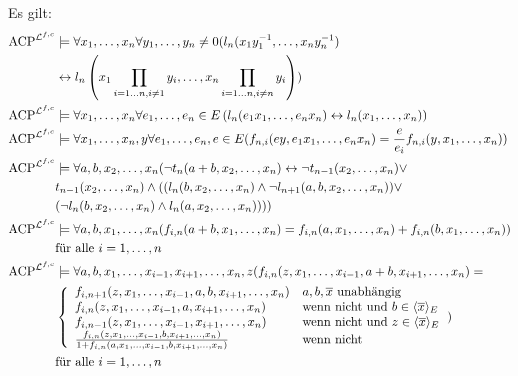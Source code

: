     \begin{lemma}\label{Eliminierungsregeln}
    	Es gilt:\\
    	\begin{align*}\operatorname{ACP}^{\lfc}&\models\forall x_1,\dots,x_n\forall y_1,\dots,y_n\neq0(l_n(x_1y_1^{-1},\dots,x_ny_n^{-1})\\&\leftrightarrow l_n\left(x_1\prod\limits_{i=1\dots n,i\neq 1}y_i,\dots,x_n\prod\limits_{i=1\dots n,i\neq n}y_i\right))\\
    	\operatorname{ACP}^{\lfc}&\models\forall x_1,\dots,x_n\forall e_1,\dots,e_n\in E\left(l_n(e_1x_1,\dots,e_nx_n)\leftrightarrow l_n(x_1,\dots,x_n)\right)\\
    	\operatorname{ACP}^{\lfc}&\models\forall x_1,\dots,x_n,y\forall e_1,\dots,e_n,e\in E(f_{n,i}(ey,e_1x_1,\dots,e_nx_n)=\frac{e}{e_i}f_{n,i}(y,x_1,\dots,x_n))\\
    	\operatorname{ACP}^{\lfc}&\models\forall a,b,x_2,\dots,x_n(\neg t_n(a+b,x_2,\dots,x_n)\leftrightarrow\neg t_{n-1}(x_2,\dots,x_n)\lor\\
    	&t_{n-1}(x_2,\dots,x_n)\land((l_n(b,x_2,\dots,x_n)\land\neg l_{n+1}(a,b,x_2,\dots,x_n))\lor\\
    	&(\neg l_n(b,x_2,\dots,x_n)\land l_n(a,x_2,\dots,x_n))))\\
    	\operatorname{ACP}^{\lfc}&\models\forall a,b,x_1,\dots,x_n(f_{i,n}(a+b,x_1,\dots,x_n)=f_{i,n}(a,x_1,\dots,x_n)+f_{i,n}(b,x_1,\dots,x_n))\\
    	&\text{für alle }i=1,\dots,n\\
    	\operatorname{ACP}^{\lfc}&\models\forall a,b,x_1,\dots,x_{i-1},x_{i+1},\dots,x_n,z(f_{i,n}(z,x_1,\dots,x_{i-1},a+b,x_{i+1},\dots,x_n)=\\
    	&\left\{\begin{array}{ll}
    	f_{i,n+1}(z,x_1,\dots,x_{i-1},a,b,x_{i+1},\dots,x_n)& a,b,\overline{x}\text{ unabhängig}\\
    	f_{i,n}(z,x_1,\dots,x_{i-1},a,x_{i+1},\dots,x_n)&\text{wenn nicht und }b\in\langle\overline{x}\rangle_E\\
    	f_{i,n-1}(z,x_1,\dots,x_{i-1},x_{i+1},\dots,x_n)&\text{wenn nicht und }z\in\langle\overline{x}\rangle_E\\
    	\frac{f_{i,n}(z,x_1,\dots,x_{i-1},b,x_{i+1},\dots,x_n)}{1+f_{i,n}(a,x_1,\dots,x_{i-1},b,x_{i+1},\dots,x_n)}&\text{wenn nicht}
    	\end{array}\right.)\\
    	&\text{für alle }i=1,\dots,n\\

\end{align*}
\end{lemma}
